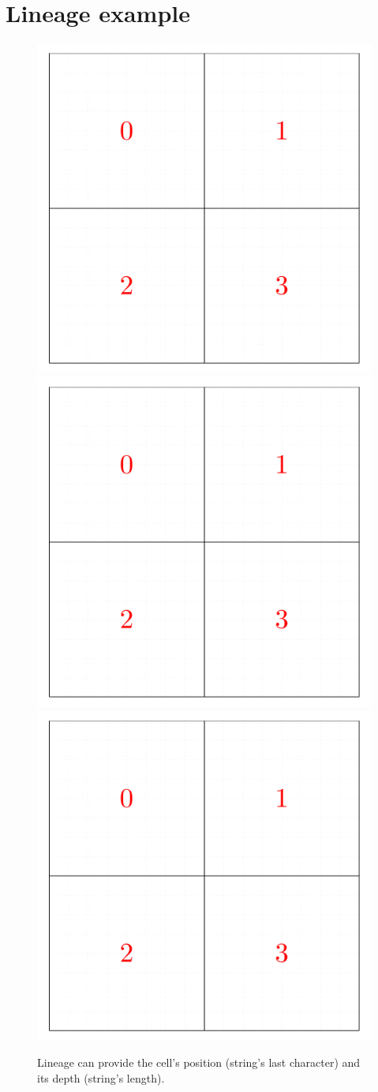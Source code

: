 \newpage 
\appendices

\section{Lineage example}\label{fig:lineage_example}
\begin{figure}[!ht]\label{fig:lineage}
    \includegraphics[page=1,width=0.32\linewidth]{figures/cellinpolygon/lineage}
    \includegraphics[page=2,width=0.32\linewidth]{figures/cellinpolygon/lineage}
    \includegraphics[page=3,width=0.32\linewidth]{figures/cellinpolygon/lineage}
    \caption{Lineage can provide the cell's position (string's last character) and its depth (string's length).}
\end{figure}

